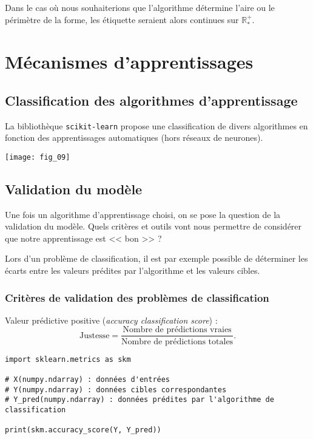 \begin{exemple}
Dans le cas où nous souhaiterions que l'algorithme détermine l'aire ou le périmètre de la forme, les étiquette seraient alors continues sur $\mathbb{R}^{+}_{*}$.

\end{exemple}


\section{Mécanismes d'apprentissages}

\subsection{Classification des algorithmes d'apprentissage}

La bibliothèque \texttt{scikit-learn} propose une classification de divers algorithmes en fonction des apprentissages automatiques (hors réseaux de neurones).


\begin{center}
\texttt{[image: fig\_09]}
\end{center}


\subsection{Validation du modèle}
Une fois un algorithme d'apprentissage choisi, on se pose la question de la validation du modèle. Quels critères et outils vont nous permettre de considérer que notre apprentissage est << bon >> ?

Lors d'un problème de classification, il est par exemple possible de déterminer les écarts entre les valeurs prédites par l'algorithme et les valeurs cibles.

\subsubsection{Critères de validation des problèmes de classification}



\begin{defi}
Valeur prédictive positive (\textit{accuracy classification score}) :
$$
\text{Justesse} = \dfrac{\text{Nombre de prédictions vraies}}{\text{Nombre de prédictions totales}}.
$$
\end{defi}

\begin{lstlisting}
import sklearn.metrics as skm

# X(numpy.ndarray) : données d'entrées
# Y(numpy.ndarray) : données cibles correspondantes
# Y_pred(numpy.ndarray) : données prédites par l'algorithme de classification

print(skm.accuracy_score(Y, Y_pred))
\end{lstlisting}



